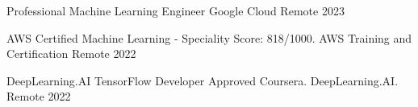 

\begin{cvhonors}

  \cvhonor
    {Professional Machine Learning Engineer} %
    {Google Cloud} %
    {Remote} %
    {2023} %

  \cvhonor
    {AWS Certified Machine Learning - Speciality} %
    {Score: 818/1000. AWS Training and Certification} %
    {Remote} %
    {2022} %

  \cvhonor
  {DeepLearning.AI TensorFlow Developer} %
  {Approved Coursera. DeepLearning.AI.} %
  {Remote} %
  {2022} %

\end{cvhonors}
